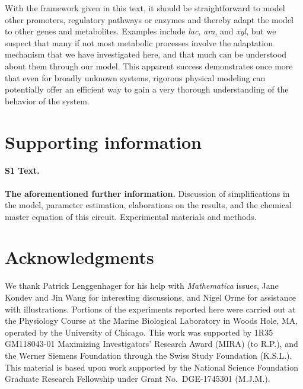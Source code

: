 \documentclass[10pt,letterpaper]{article}
\begin{document}
	With the framework given in this text, it
	should be straightforward to model other promoters, regulatory pathways or
	enzymes and thereby adapt the model to other genes and metabolites. Examples
	include \emph{lac}, \emph{ara}, and \emph{xyl}, but we suspect that many if
	not most metabolic processes involve the adaptation mechanism that we have
	investigated here, and that much can be understood about them through our
	model. This apparent success demonstrates once more that even for broadly
	unknown systems, rigorous physical modeling can potentially offer an
	efficient way to gain a very thorough understanding of the behavior of the
	system. 
	
	
	\section*{Supporting information}
	\paragraph*{S1 Text.}
	\label{S1_Text}
	{\bf The aforementioned further information.} Discussion of simplifications
	in the model, parameter estimation, elaborations on the results, and the
	chemical master equation of this circuit. Experimental materials and methods.
	
	\section*{Acknowledgments}
	We thank Patrick Lenggenhager for his help with \emph{Mathematica} issues, Jane Kondev and Jin Wang for interesting discussions, and Nigel Orme for assistance with illustrations.
	Portions of the experiments reported here were carried out at the
	Physiology Course at the Marine Biological Laboratory in Woods
	Hole, MA, operated by the University of Chicago.
	This work was supported by 1R35 GM118043-01 Maximizing Investigators'
	Research Award (MIRA) (to R.P.), and the Werner Siemens Foundation
	through the Swiss Study Foundation (K.S.L.). This material is based upon
	work supported by the National Science Foundation Graduate Research
	Fellowship under Grant No.\ DGE-1745301 (M.J.M.).
	
	\nolinenumbers
	
	
\end{document}
